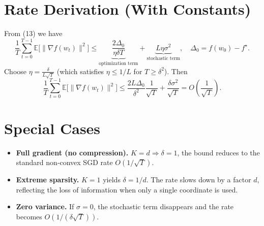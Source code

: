 \documentclass{article}
\newcommand{\E}{\mathbb{E}}
\begin{document}
\section*{Rate Derivation (With Constants)}
From (13) we have
\[
\frac{1}{T}\sum_{t=0}^{T-1}\E\!\big[\|\nabla f(w_t)\|^{2}\big]
\le \underbrace{\frac{2\Delta_{0}}{\eta\delta T}}_{\text{optimization term}}
   +\underbrace{L\eta\sigma^{2}}_{\text{stochastic term}},
\quad\Delta_{0}=f(w_0)-f^{\star}.
\]
Choose $\eta=\frac{\delta}{L\sqrt{T}}$ (which satisfies $\eta\le1/L$ for $T\ge\delta^{2}$). Then
\[
\frac{1}{T}\sum_{t=0}^{T-1}\E\!\big[\|\nabla f(w_t)\|^{2}\big]
\le
\frac{2L\Delta_{0}}{\delta^{2}}\frac{1}{\sqrt{T}}
   +\frac{\delta\sigma^{2}}{\sqrt{T}}
=O\!\left(\frac{1}{\sqrt{T}}\right).
\]

\section*{Special Cases}
\begin{itemize}
\item \textbf{Full gradient (no compression).} $K=d\Rightarrow\delta=1$, the bound reduces to the standard non‑convex SGD rate $O(1/\sqrt{T})$.
\item \textbf{Extreme sparsity.} $K=1$ yields $\delta=1/d$. The rate slows down by a factor $d$, reflecting the loss of information when only a single coordinate is used.
\item \textbf{Zero variance.} If $\sigma=0$, the stochastic term disappears and the rate becomes $O(1/(\delta\sqrt{T}))$.
\end{itemize}
\end{document}
